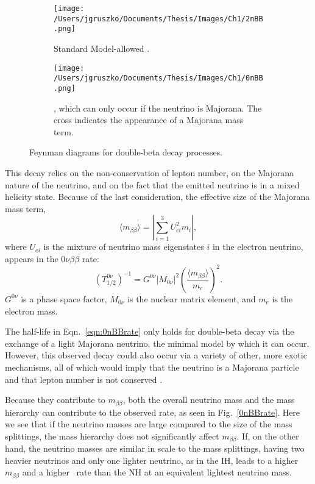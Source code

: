  \begin{figure}[h]
 \centering
    \begin{subfigure}[t]{.40\textwidth}
      \texttt{[image: /Users/jgruszko/Documents/Thesis/Images/Ch1/2nBB.png]}
       \caption{Standard Model-allowed \twonubb.}
        \label{2nBB}
        \end{subfigure}   
         \hfil
        \begin{subfigure}[t]{0.4\textwidth}
      \texttt{[image: /Users/jgruszko/Documents/Thesis/Images/Ch1/0nBB.png]} 
      \caption{\nonubb, which can only occur if the neutrino is Majorana. The cross indicates the appearance of a Majorana mass term.}
      \label{0nBB}
    \end{subfigure}   
    \caption{Feynman diagrams for double-beta decay processes.}
\end{figure}

This decay relies on the non-conservation of lepton number, on the Majorana nature of the neutrino, and on the fact that the emitted neutrino is in a mixed helicity state. Because of the last consideration, the effective size of the Majorana mass term, 
 $$\langle m_{\beta\beta} \rangle = |\sum\limits_{i=1}^3 U^2_{ei}m_i|,$$
 where $U_{ei}$ is the mixture of neutrino mass eigenstates $i$ in the electron neutrino, appears in the $0\nu\beta\beta$ rate:
 \begin{equation}
 (T_{1/2}^{0\nu})^{-1} = G^{0\nu}|M_{0\nu}|^{2}\left(\frac{\langle m_{\beta\beta} \rangle}{m_e}\right)^2 .
 \label{eqn:0nBBrate}
 \end{equation}
 $G^{0\nu}$ is a phase space factor, $M_{0\nu}$ is the nuclear matrix element, and $m_e$ is the electron mass. 

The half-life in Eqn.~\ref{eqn:0nBBrate} only holds for double-beta decay via the exchange of a light Majorana neutrino, the minimal model by which it can occur. However, this observed decay could also occur via a variety of other, more exotic mechanisms, all of which would imply that the neutrino is a Majorana particle and that lepton number is not conserved \cite{Schechter1982}. 
 
Because they contribute to $m_{\beta\beta}$, both the overall neutrino mass and the mass hierarchy can contribute to the observed rate, as seen in Fig.~\ref{0nBBrate}. Here we see that if the neutrino masses are large compared to the size of the mass splittings, the mass hierarchy does not significantly affect $m_{\beta\beta}$. If, on the other hand, the neutrino masses are similar in scale to the mass splittings, having two heavier neutrinos and only one lighter neutrino, as in the IH, leads to a higher $m_{\beta\beta}$ and a higher \nonubb\ rate than the NH at an equivalent lightest neutrino mass. 
 
